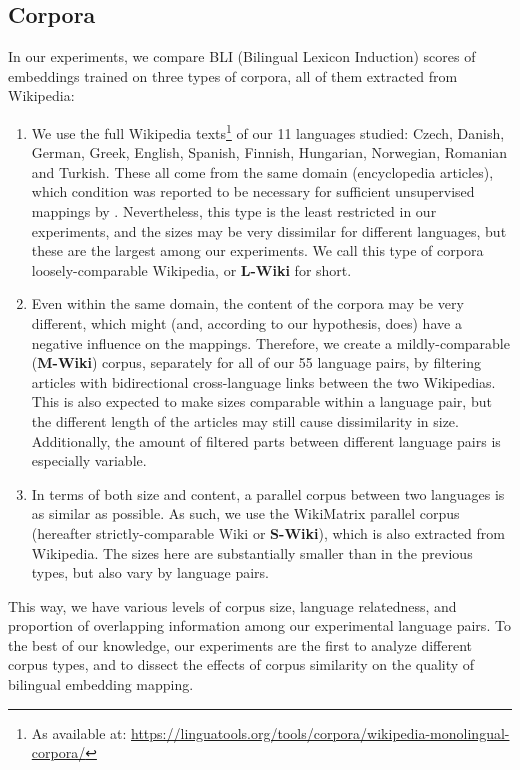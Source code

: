 \documentclass[11pt]{article}
\begin{document}
\subsection{Corpora}
    In our experiments, we compare BLI (Bilingual Lexicon Induction) scores of embeddings trained on three types of corpora, all of them extracted from Wikipedia:
    \begin{enumerate}
        \item We use the full Wikipedia texts\footnote{As available at: \href{https://linguatools.org/tools/corpora/wikipedia-monolingual-corpora/}{https://linguatools.org/tools/corpora/wikipedia-monolingual-corpora/}} of our 11 languages studied: Czech, Danish, German, Greek, English, Spanish, Finnish, Hungarian, Norwegian, Romanian and Turkish. These all come from the same domain (encyclopedia articles), which condition was reported to be necessary for sufficient unsupervised mappings by . Nevertheless, this type is the least restricted in our experiments, and the sizes may be very dissimilar for different languages, but these are the largest among our experiments. We call this type of corpora loosely-comparable Wikipedia, or \textbf{L-Wiki} for short.
        
        \item Even within the same domain, the content of the corpora may be very different, which might (and, according to our hypothesis, does) have a negative influence on the mappings. Therefore, we create a mildly-comparable (\textbf{M-Wiki}) corpus, separately for all of our 55 language pairs, by filtering articles with bidirectional cross-language links between the two Wikipedias. This is also expected to make sizes comparable within a language pair, but the different length of the articles may still cause dissimilarity in size. Additionally, the amount of filtered parts between different language pairs is especially variable.
        
        \item In terms of both size and content, a parallel corpus between two languages is as similar as possible. As such, we use the WikiMatrix \cite{schwenk-etal-2021-wikimatrix} parallel corpus (hereafter strictly-comparable Wiki or \textbf{S-Wiki}), which is also extracted from Wikipedia. The sizes here are substantially smaller than in the previous types, but also vary by language pairs.
    \end{enumerate}
    
    This way, we have various levels of corpus size, language relatedness, and proportion of overlapping information among our experimental language pairs.
    To the best of our knowledge, our experiments are the first 
    to analyze different corpus types, and to dissect the effects of corpus similarity on the quality of bilingual embedding mapping.
    
\end{document}
